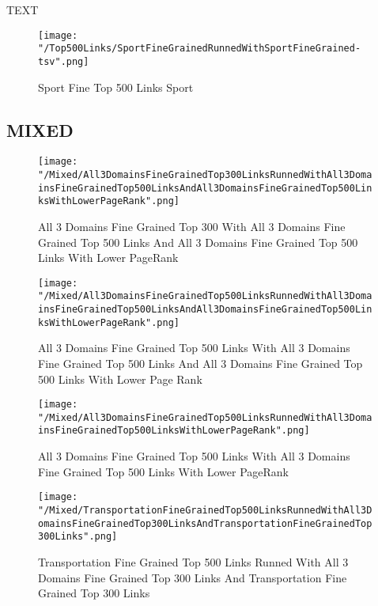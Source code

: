\documentclass[thesis=M,english]{FITthesis}[2018/05/30]
\begin{document}
		TEXT	

	\begin{figure}\centering
		\texttt{[image: "/Top500Links/SportFineGrainedRunnedWithSportFineGrained-tsv".png]}
		\caption{Sport Fine Top 500 Links Sport}\label{}	
	\end{figure}			
	\subsection{MIXED}
		
	\begin{figure}\centering
		\texttt{[image: "/Mixed/All3DomainsFineGrainedTop300LinksRunnedWithAll3DomainsFineGrainedTop500LinksAndAll3DomainsFineGrainedTop500LinksWithLowerPageRank".png]}
		\caption{All 3 Domains Fine Grained Top 300 With All 3 Domains Fine Grained Top 500 Links And All 3 Domains Fine Grained Top 500 Links With Lower PageRank}\label{}
	\end{figure}
	
	\begin{figure}
		\texttt{[image: "/Mixed/All3DomainsFineGrainedTop500LinksRunnedWithAll3DomainsFineGrainedTop500LinksAndAll3DomainsFineGrainedTop500LinksWithLowerPageRank".png]}		\caption{All 3 Domains Fine Grained Top 500 Links  With All 3 Domains Fine Grained Top 500 Links And All 3 Domains Fine Grained Top 500 Links With Lower Page Rank}
	\end{figure}

	\begin{figure}
		\texttt{[image: "/Mixed/All3DomainsFineGrainedTop500LinksRunnedWithAll3DomainsFineGrainedTop500LinksWithLowerPageRank".png]}		
		\caption{All 3 Domains Fine Grained Top 500 Links With All 3 Domains Fine Grained Top 500 Links With Lower PageRank}
	\end{figure}

	\begin{figure}
		\texttt{[image: "/Mixed/TransportationFineGrainedTop500LinksRunnedWithAll3DomainsFineGrainedTop300LinksAndTransportationFineGrainedTop300Links".png]}		
		\caption{Transportation Fine Grained Top 500 Links Runned With All 3 Domains Fine Grained Top 300 Links And Transportation Fine Grained Top 300 Links}
	\end{figure}	
\end{document}

